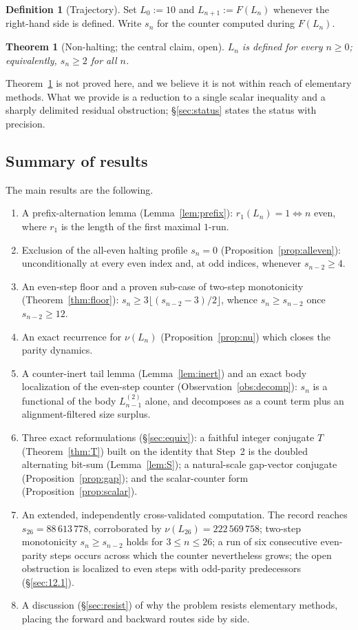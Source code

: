 \documentclass[11pt,reqno]{amsart}
\theoremstyle{plain}
\newtheorem{thm}[theorem]{Theorem}
\theoremstyle{definition}
\newtheorem{definition}{Definition}
\theoremstyle{remark}
\begin{document}
\begin{definition}[Trajectory]\label{def:traj}
Set $L_0:=10$ and $L_{n+1}:=F(L_n)$ whenever the right-hand side is defined. Write $s_n$ for the counter computed during $F(L_n)$.
\end{definition}

\begin{thm}[Non-halting; the central claim, open]\label{thm:central}
$L_n$ is defined for every $n\ge 0$; equivalently, $s_n\ge 2$ for all $n$.
\end{thm}

Theorem~\ref{thm:central} is not proved here, and we believe it is not within reach of elementary methods. What we provide is a reduction to a single scalar inequality and a sharply delimited residual obstruction; \S\ref{sec:status} states the status with precision.

\subsection{Summary of results} The main results are the following.
\begin{enumerate}[label=(\roman*)]
\item A prefix-alternation lemma (Lemma~\ref{lem:prefix}): $r_1(L_n)=1\iff n$ even, where $r_1$ is the length of the first maximal $1$-run.
\item Exclusion of the all-even halting profile $s_n=0$ (Proposition~\ref{prop:alleven}): unconditionally at every even index and, at odd indices, whenever $s_{n-2}\ge 4$.
\item An even-step floor and a proven sub-case of two-step monotonicity (Theorem~\ref{thm:floor}): $s_n\ge 3\lfloor(s_{n-2}-3)/2\rfloor$, whence $s_n\ge s_{n-2}$ once $s_{n-2}\ge 12$.
\item An exact recurrence for $\nu(L_n)$ (Proposition~\ref{prop:nu}) which closes the parity dynamics.
\item A counter-inert tail lemma (Lemma~\ref{lem:inert}) and an exact body localization of the even-step counter (Observation~\ref{obs:decomp}): $s_n$ is a functional of the body $L^{(2)}_{n-1}$ alone, and decomposes as a count term plus an alignment-filtered size surplus.
\item Three exact reformulations (\S\ref{sec:equiv}): a faithful integer conjugate $T$ (Theorem~\ref{thm:T}) built on the identity that Step~2 is the doubled alternating bit-sum (Lemma~\ref{lem:S}); a natural-scale gap-vector conjugate (Proposition~\ref{prop:gap}); and the scalar-counter form (Proposition~\ref{prop:scalar}).
\item An extended, independently cross-validated computation. The record reaches $s_{26}=88\,613\,778$, corroborated by $\nu(L_{26})=222\,569\,758$; two-step monotonicity $s_n\ge s_{n-2}$ holds for $3\le n\le 26$; a run of six consecutive even-parity steps occurs across which the counter nevertheless grows; the open obstruction is localized to even steps with odd-parity predecessors (\S\ref{sec:12.1}).
\item A discussion (\S\ref{sec:resist}) of why the problem resists elementary methods, placing the forward and backward routes side by side.
\end{enumerate}
\end{document}
